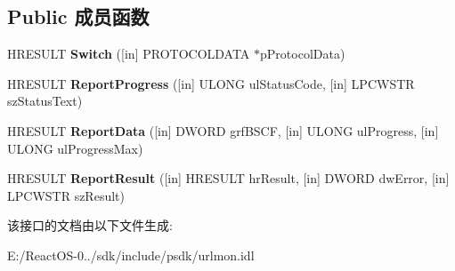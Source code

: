 \subsection*{Public 成员函数}
\begin{DoxyCompactItemize}
\item 
\mbox{\label{interface_i_internet_protocol_sink_a9be269970efeb5d95b913e8878f2173b}} 
H\+R\+E\+S\+U\+LT {\bfseries Switch} (\mbox{[}in\mbox{]} P\+R\+O\+T\+O\+C\+O\+L\+D\+A\+TA $\ast$p\+Protocol\+Data)
\item 
\mbox{\label{interface_i_internet_protocol_sink_aa9cb4cf96bd016907aae4f3844805e97}} 
H\+R\+E\+S\+U\+LT {\bfseries Report\+Progress} (\mbox{[}in\mbox{]} U\+L\+O\+NG ul\+Status\+Code, \mbox{[}in\mbox{]} L\+P\+C\+W\+S\+TR sz\+Status\+Text)
\item 
\mbox{\label{interface_i_internet_protocol_sink_af2654c5cc22ac2f756e383f1c6a3bbbb}} 
H\+R\+E\+S\+U\+LT {\bfseries Report\+Data} (\mbox{[}in\mbox{]} D\+W\+O\+RD grf\+B\+S\+CF, \mbox{[}in\mbox{]} U\+L\+O\+NG ul\+Progress, \mbox{[}in\mbox{]} U\+L\+O\+NG ul\+Progress\+Max)
\item 
\mbox{\label{interface_i_internet_protocol_sink_a8d44bd43c09bf33a2266e1fba652aa15}} 
H\+R\+E\+S\+U\+LT {\bfseries Report\+Result} (\mbox{[}in\mbox{]} H\+R\+E\+S\+U\+LT hr\+Result, \mbox{[}in\mbox{]} D\+W\+O\+RD dw\+Error, \mbox{[}in\mbox{]} L\+P\+C\+W\+S\+TR sz\+Result)
\end{DoxyCompactItemize}


该接口的文档由以下文件生成\+:\begin{DoxyCompactItemize}
\item 
E\+:/\+React\+O\+S-\/0../sdk/include/psdk/urlmon.\+idl\end{DoxyCompactItemize}
